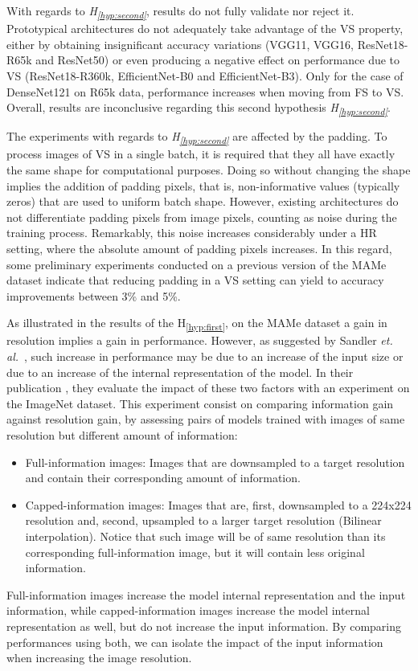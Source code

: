 \documentclass{article}
\newcommand{\hypref}[1]{\textup{H\textsubscript{\ref{#1}}}}
\begin{document}
With regards to \textit{\hypref{hyp:second}}, results do not fully validate nor reject it. Prototypical architectures do not adequately take advantage of the VS property, either by obtaining insignificant accuracy variations (VGG11, VGG16, ResNet18-R65k and ResNet50) or even producing a negative effect on performance due to VS (ResNet18-R360k, EfficientNet-B0 and EfficientNet-B3). Only for the case of DenseNet121 on R65k data, performance increases when moving from FS to VS. Overall, results are inconclusive regarding this second hypothesis \textit{\hypref{hyp:second}}.

The experiments with regards to \textit{\hypref{hyp:second}} are affected by the padding. To process images of VS in a single batch, it is required that they all have exactly the same shape for computational purposes. Doing so without changing the shape implies the addition of padding pixels, that is, non-informative values (typically zeros) that are used to uniform batch shape. However, existing architectures do not differentiate padding pixels from image pixels, counting as noise during the training process. Remarkably, this noise increases considerably under a HR setting, where the absolute amount of padding pixels increases. In this regard, some preliminary experiments conducted on a previous version of the MAMe dataset \citep{sotiropoulos2020handling} indicate that reducing padding in a VS setting can yield to accuracy improvements between 3\% and 5\%.


As illustrated in the results of the \hypref{hyp:first}, on the MAMe dataset a gain in resolution implies a gain in performance. However, as suggested by Sandler \textit{et. al.}~\citep{sandler2019nondiscriminative}, such increase in performance may be due to an increase of the input size or due to an increase of the internal representation of the model. In their publication \citep{sandler2019nondiscriminative}, they evaluate the impact of these two factors with an experiment on the ImageNet dataset. This experiment consist on comparing information gain against resolution gain, by assessing pairs of models trained with images of same resolution but different amount of information:
\begin{itemize}
    \item Full-information images: Images that are downsampled to a target resolution and contain their corresponding amount of information.
    \item Capped-information images: Images that are, first, downsampled to a 224x224 resolution and, second, upsampled to a larger target resolution (Bilinear interpolation). Notice that such image will be of same resolution than its corresponding full-information image, but it will contain less original information.
\end{itemize}
Full-information images increase the model internal representation and the input information, while capped-information images increase the model internal representation as well, but do not increase the input information. By comparing performances using both, we can isolate the impact of the input information when increasing the image resolution.
\end{document}
